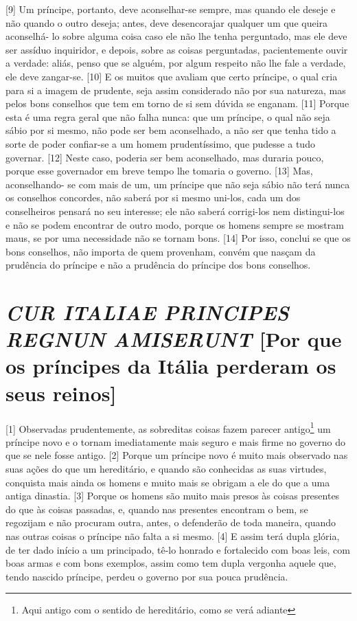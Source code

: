 {[}9{]} Um príncipe, portanto, deve aconselhar-se sempre, mas quando ele
deseje e não quando o outro deseja; antes, deve desencorajar qualquer um
que queira aconselhá- lo sobre alguma coisa caso ele não lhe tenha
perguntado, mas ele deve ser assíduo inquiridor, e depois, sobre as
coisas perguntadas, pacientemente ouvir a verdade: aliás, penso que se
alguém, por algum respeito não lhe fale a verdade, ele deve zangar-se.
{[}10{]} E os muitos que avaliam que certo príncipe, o qual cria para si
a imagem de prudente, seja assim considerado não por sua natureza, mas
pelos bons conselhos que tem em torno de si sem dúvida se enganam.
{[}11{]} Porque esta é uma regra geral que não falha nunca: que um
príncipe, o qual não seja sábio por si mesmo, não pode ser bem
aconselhado, a não ser que tenha tido a sorte de poder confiar-se a um
homem prudentíssimo, que pudesse a tudo governar. {[}12{]} Neste caso,
poderia ser bem aconselhado, mas duraria pouco, porque esse governador
em breve tempo lhe tomaria o governo. {[}13{]} Mas, aconselhando- se com
mais de um, um príncipe que não seja sábio não terá nunca os conselhos
concordes, não saberá por si mesmo uni-los, cada um dos conselheiros
pensará no seu interesse; ele não saberá corrigi-los nem distingui-los e
não se podem encontrar de outro modo, porque os homens sempre se mostram
maus, se por uma necessidade não se tornam bons. {[}14{]} Por isso,
conclui se que os bons conselhos, não importa de quem provenham, convém
que nasçam da prudência do príncipe e não a prudência do príncipe dos
bons conselhos.

\quebra\section{\emph{CUR ITALIAE PRINCIPES REGNUN AMISERUNT}
{[}Por que os príncipes da Itália perderam os seus reinos{]}}

{[}1{]} Observadas prudentemente, as sobreditas coisas fazem parecer
antigo\footnote{Aqui antigo com o sentido de hereditário, como se verá
  adiante} um príncipe novo e o tornam imediatamente mais seguro e mais
firme no governo do que se nele fosse antigo. {[}2{]} Porque um príncipe
novo é muito mais observado nas suas ações do que um hereditário, e
quando são conhecidas as suas virtudes, conquista mais ainda os homens e
muito mais se obrigam a ele do que a uma antiga dinastia. {[}3{]} Porque
os homens são muito mais presos às coisas presentes do que às coisas
passadas, e, quando nas presentes encontram o bem, se regozijam e não
procuram outra, antes, o defenderão de toda maneira, quando nas outras
coisas o príncipe não falta a si mesmo. {[}4{]} E assim terá dupla
glória, de ter dado início a um principado, tê-lo honrado e fortalecido
com boas leis, com boas armas e com bons exemplos, assim como tem dupla
vergonha aquele que, tendo nascido príncipe, perdeu o governo por sua
pouca prudência.

